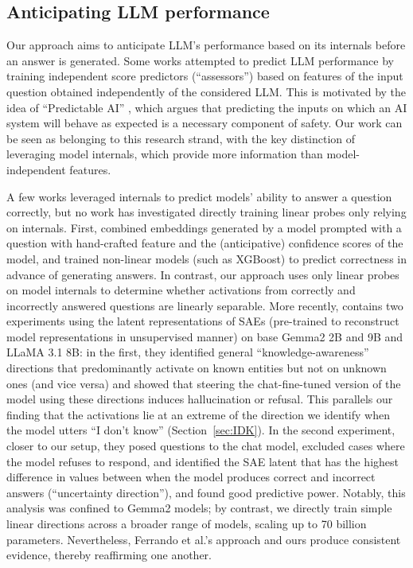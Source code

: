 \documentclass{article} %
\begin{document}
\subsection{Anticipating LLM performance}

Our approach aims to anticipate LLM's performance based on its internals before an answer is generated. Some works \citep{hernandez2022training, zhou2022reject, schellaert2024analysing, pacchiardi2024100instancesneedpredicting,pacchiardi2025predictaboardbenchmarkingllmscore} attempted to predict LLM performance by training independent score predictors (``assessors'') based on features of the input question obtained independently of the considered LLM. This is motivated by the idea of ``Predictable AI'' \citep{zhou2024predictableartificialintelligence}, which argues that predicting the inputs on which an AI system will behave as expected is a necessary component of safety. Our work can be seen as belonging to this research strand, with the key distinction of leveraging model internals, which provide more information than model-independent features. 


A few works leveraged internals to predict models' ability to answer a question correctly, but no work has investigated directly training linear probes only relying on internals. First, \cite{kamath-etal-2020-selective} combined embeddings generated by a model prompted with a question with hand-crafted feature and the (anticipative) confidence scores of the model, and trained non-linear models (such as XGBoost) to predict correctness in advance of generating answers.  In contrast, our approach uses only linear probes on model internals to determine whether activations from correctly and incorrectly answered questions are linearly separable.
More recently, \cite{ferrando2025do} contains two experiments using the latent representations of SAEs (pre-trained to reconstruct model representations in unsupervised manner) on base Gemma2 2B and 9B  and LLaMA 3.1 8B: in the first, they identified general ``knowledge-awareness'' directions that predominantly activate on known entities but not on unknown ones (and vice versa) and showed that steering the chat-fine-tuned version of the model using these directions induces hallucination or refusal. This parallels our finding that the activations lie at an extreme of the direction we identify when the model utters ``I don't know'' (Section~\ref{sec:IDK}). In the second experiment, closer to our setup, they posed questions to the chat model, excluded cases where the model refuses to respond, and identified the SAE latent that has the highest difference in values between when the model produces correct and incorrect answers (``uncertainty direction''), and found good predictive power. Notably, this analysis was confined to Gemma2 models; by contrast, we directly train simple linear directions across a broader range of models, scaling up to 70 billion parameters. Nevertheless, Ferrando et al.’s approach and ours produce consistent evidence, thereby reaffirming one another.
\end{document}
